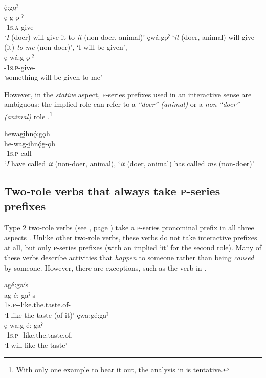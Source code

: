 \ea\label{ex:3aspswitex15}
\ea ę́:gǫˀ\\\label{ex:3aspswitex15a}
\gll ę-g-ǫ-ˀ\\
 \fut-\textsc{1s.a}-give-{\punctual}\\
\glt `\emph{I} (doer) will give it to \emph{it} (non-doer, animal)'
\ex ęwá:gǫˀ ‘\emph{it} (doer, animal) will give (it) \emph{to me} (non-doer)’, ‘I will be given’,\\\label{ex:3aspswitex15b}
\gll ę-wá:g-ǫ-ˀ\\
 \fut-\textsc{1s.p}-give-{\punctual}\\
\glt `something will be given to me'
\z
\z

However, in the \emph{stative} aspect, \textsc{p}-series prefixes used in an interactive sense are ambiguous: the implied role can refer to a \textit{“doer” (animal)} or a \textit{non-“doer” (animal)} role .\footnote{With only one example to bear it out, the analysis in  is tentative.}

\newpage
\ea\label{ex:3aspswitex20} hewagi̱hnǫ́:gǫh\\
\gll he-wag-i̱hnǫ́g-ǫh\\
{\translocative}-\textsc{1s.p}-call-{\stative}\\
\glt ‘\emph{I} have called \emph{it} (non-doer, animal), ‘\emph{it} (doer, animal) has called \emph{me} (non-doer)’
\z


\subsection{Two-role verbs that always take \textsc{p}-series prefixes} \label{Two-role verbs that always take o prefixes}
Type 2 two-role verbs (see , page \pageref{figtab:1:ppthreeaspv}) take a \textsc{p}-series pronominal prefix in all three aspects . Unlike other two-role verbs, these verbs do not take interactive prefixes at all, but only \textsc{p}-series prefixes (with an implied ‘it’ for the second role). Many of these verbs describe activities that \emph{happen} to someone rather than being \emph{caused} by someone. However, there are exceptions, such as the verb in .

\ea\label{ex:3aspswitex10}
\ea agé:gaˀs\\
\gll ag-é:-gaˀ-s\\
 \textsc{1s.p}-{\joinerE}-like.the.taste.of-{\habitual}\\
\glt `I like the taste (of it)'
\ex ęwa:gé:gaˀ\\
\gll ę-wa:g-é:-gaˀ\\
 \fut-\textsc{1s.p}-{\joinerE}-like.the.\-taste.of.{\zeropunctual}\\
\glt `I will like the taste'

